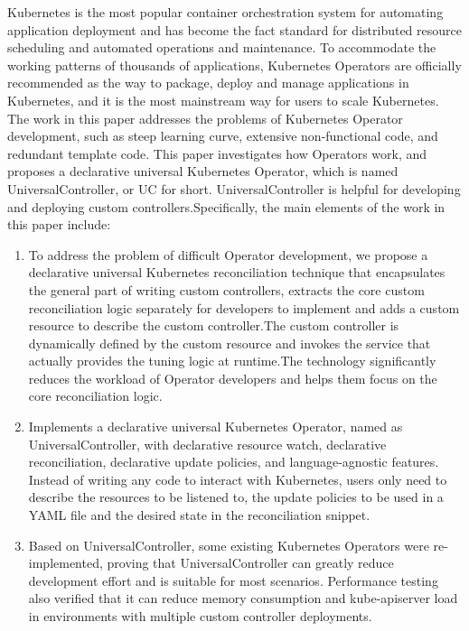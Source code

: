 \documentclass[macfonts,master]{njuthesis}
\begin{document}
\begin{englishabstract}
Kubernetes is the most popular container orchestration system for automating application deployment and has become the fact standard for distributed resource scheduling and automated operations and maintenance. To accommodate the working patterns of thousands of applications, Kubernetes Operators are officially recommended as the way to package, deploy and manage applications in Kubernetes, and it is the most mainstream way for users to scale Kubernetes. The work in this paper addresses the problems of Kubernetes Operator development, such as steep learning curve, extensive non-functional code, and redundant template code. This paper investigates how Operators work, and proposes a declarative universal Kubernetes Operator, which is named UniversalController, or UC for short. UniversalController is helpful for developing and deploying custom controllers.Specifically, the main elements of the work in this paper include:

\begin{enumerate}
	\item To address the problem of difficult Operator development, we propose a declarative universal Kubernetes reconciliation technique that encapsulates the general part of writing custom controllers, extracts the core custom reconciliation logic separately for developers to implement and adds a custom resource to describe the custom controller.The custom controller is dynamically defined by the custom resource and invokes the service that actually provides the tuning logic at runtime.The technology significantly reduces the workload of Operator developers and helps them focus on the core reconciliation logic. 
	\item Implements a declarative universal Kubernetes Operator, named as UniversalController, with declarative resource watch, declarative reconciliation, declarative update policies, and language-agnostic features. Instead of writing any code to interact with Kubernetes, users only need to describe the resources to be listened to, the update policies to be used in a YAML file and the desired state in the reconciliation snippet.
	\item Based on UniversalController, some existing Kubernetes Operators were re-implemented, proving that UniversalController can greatly reduce development effort and is suitable for most scenarios. Performance testing also verified that it can reduce memory consumption and kube-apiserver load in environments with multiple custom controller deployments.
\end{enumerate}

\end{englishabstract}
\end{document}
